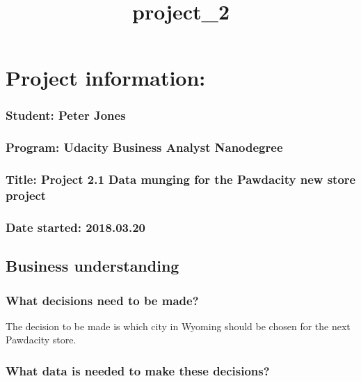 \documentclass[11pt]{article}
\title{project\_2}
\begin{document}
    
    
    \maketitle
    
    

    
    \section{Project information:}\label{project-information}

\subsubsection{Student: Peter Jones}\label{student-peter-jones}

\subsubsection{Program: Udacity \textbar{} Business Analyst
Nanodegree}\label{program-udacity-business-analyst-nanodegree}

\subsubsection{Title: Project 2.1 \textbar{} Data munging for the
Pawdacity new store
project}\label{title-project-2.1-data-munging-for-the-pawdacity-new-store-project}

\subsubsection{Date started: 2018.03.20}\label{date-started-2018.03.20}

    \subsection{Business understanding}\label{business-understanding}

    \subsubsection{What decisions need to be
made?}\label{what-decisions-need-to-be-made}

The decision to be made is which city in Wyoming should be chosen for
the next Pawdacity store.

    \subsubsection{What data is needed to make these
decisions?}\label{what-data-is-needed-to-make-these-decisions}
\end{document}
